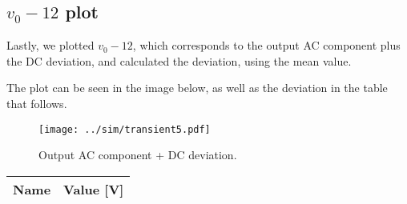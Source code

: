 \subsection{$v_0 - 12$ plot}
Lastly, we plotted $v_0 - 12$, which corresponds to the output AC component plus the DC deviation, and calculated the deviation, using the mean value. \par
The plot can be seen in the image below, as well as the deviation in the table that follows.\par

\begin{figure}[H] \centering
\texttt{[image: ../sim/transient5.pdf]}
\caption{Output AC component + DC deviation.}
\label{fig:transient5}
\end{figure}

\begin{table}[H]
  \centering
  \begin{tabular}{|l|r|}
    \hline    
    {\bf Name} & {\bf Value [V]} \\ \hline
    
  \end{tabular}
  \label{tab:meanv012}
\end{table}